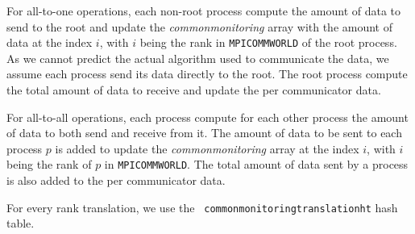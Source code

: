 For all-to-one operations, each non-root process compute the amount of
data to send to the root and update the {\it common\brkunds{}monitoring}
array with the amount of data at the index $i$, with $i$ being the
rank in {\tt MPI\brkunds{}COMM\brkunds{}WORLD} of the root process. As
we cannot predict the actual algorithm used to communicate the data,
we assume each process send its data directly to the root. The root
process compute the total amount of data to receive and update the per
communicator data.

For all-to-all operations, each process compute for each other process
the amount of data to both send and receive from it. The amount of
data to be sent to each process $p$ is added to update the {\it
  common\brkunds{}monitoring} array at the index $i$, with $i$ being
the rank of $p$ in {\tt MPI\brkunds{}COMM\brkunds{}WORLD}. The total
amount of data sent by a process is also added to the per communicator
data.

For every rank translation, we use the {\tt
  common\brkunds{}monitoring\brkunds{}translation\brkunds{}ht} hash
table.


